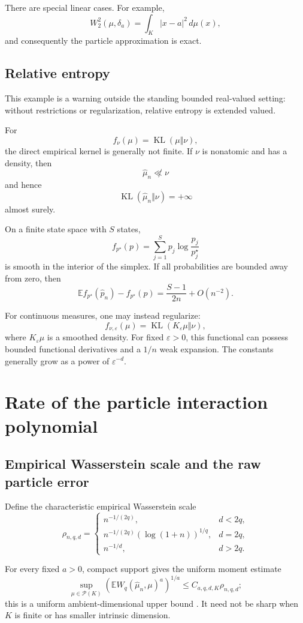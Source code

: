 \documentclass[11pt]{article}
\newcommand{\Pcal}{\mathcal P}
\newcommand{\E}{\mathbb E}
\begin{document}
There are special linear cases. For example,
\[
W_2^2(\mu,\delta_a)
=
\int_K|x-a|^2\,d\mu(x),
\]
and consequently the particle approximation is exact.

\subsection{Relative entropy}

This example is a warning outside the standing bounded real-valued
setting: without restrictions or regularization, relative entropy is
extended valued.

For
\[
f_\nu(\mu)=\operatorname{KL}(\mu\Vert\nu),
\]
the direct empirical kernel is generally not finite. If \(\nu\) is
nonatomic and has a density, then
\[
\widehat\mu_n\not\ll\nu
\]
and hence
\[
\operatorname{KL}(\widehat\mu_n\Vert\nu)=+\infty
\]
almost surely.

On a finite state space with \(S\) states,
\[
f_{p^\star}(p)
=
\sum_{j=1}^S p_j\log\frac{p_j}{p_j^\star}
\]
is smooth in the interior of the simplex. If all probabilities are
bounded away from zero, then
\[
\E f_{p^\star}(\widehat p_n)-f_{p^\star}(p)
=
\frac{S-1}{2n}+O(n^{-2}).
\]

For continuous measures, one may instead regularize:
\[
f_{\nu,\varepsilon}(\mu)
=
\operatorname{KL}(K_\varepsilon\mu\Vert\nu),
\]
where \(K_\varepsilon\mu\) is a smoothed density. For fixed
\(\varepsilon>0\), this functional can possess bounded functional
derivatives and a \(1/n\) weak expansion. The constants generally grow
as a power of \(\varepsilon^{-d}\).

\section{Rate of the particle interaction polynomial}

\subsection{Empirical Wasserstein scale and the raw particle error}
\label{sec:raw-particle}

Define the characteristic empirical Wasserstein scale
\[
\rho_{n,q,d}
=
\begin{cases}
n^{-1/(2q)},&d<2q,\\[1mm]
n^{-1/(2q)}(\log(1+n))^{1/q},&d=2q,\\[1mm]
n^{-1/d},&d>2q.
\end{cases}
\]

For every fixed \(a>0\), compact support gives the uniform moment
estimate
\[
\sup_{\mu\in\Pcal(K)}
\left(
\E W_q(\widehat\mu_n,\mu)^a
\right)^{1/a}
\leq
C_{a,q,d,K}\rho_{n,q,d};
\]
this is a uniform ambient-dimensional upper bound
\cite{dereich-scheutzow-schottstedt,fournier-guillin}. It need not be
sharp when \(K\) is finite or has smaller intrinsic dimension.
\end{document}
